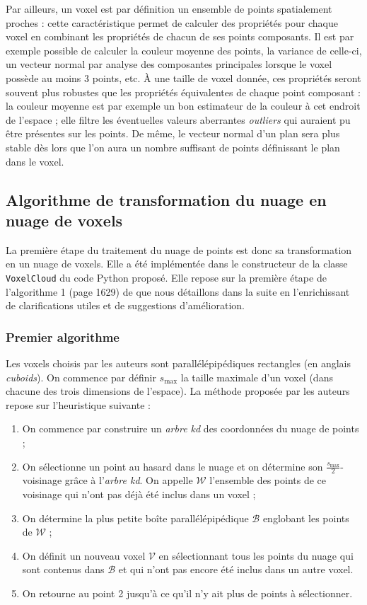 \documentclass[a4paper, onecolumn, 11pt]{article}
\newcommand{\V}{\mathcal{V}}
\begin{document}
Par ailleurs, un voxel est par définition un ensemble de points spatialement proches : cette caractéristique permet de calculer des propriétés pour chaque voxel en combinant les propriétés de chacun de ses points composants. Il est par exemple possible de calculer la couleur moyenne des points, la variance de celle-ci, un vecteur normal par analyse des composantes principales lorsque le voxel possède au moins 3 points, etc. À une taille de voxel donnée, ces propriétés seront souvent plus robustes que les propriétés équivalentes de chaque point composant : la couleur moyenne est par exemple un bon estimateur de la couleur à cet endroit de l'espace ; elle filtre les éventuelles valeurs aberrantes \emph{outliers} qui auraient pu être présentes sur les points. De même, le vecteur normal d'un plan sera plus stable dès lors que l'on aura un nombre suffisant de points définissant le plan dans le voxel.

\subsection{Algorithme de transformation du nuage en nuage de voxels}
\label{partie-algo-voxels}
La première étape du traitement du nuage de points est donc sa transformation en un nuage de voxels. Elle a été implémentée dans le constructeur de la classe \texttt{VoxelCloud} du code Python proposé. Elle repose sur la première étape de l'algorithme 1 (page 1629) de \cite{aka_article} que nous détaillons dans la suite en l'enrichissant de clarifications utiles et de suggestions d'amélioration.

\subsubsection*{Premier algorithme}
Les voxels choisis par les auteurs sont parallélépipédiques rectangles (en anglais \emph{cuboids}). On commence par définir $s_\text{max}$ la taille maximale d'un voxel (dans chacune des trois dimensions de l'espace). La méthode proposée par les auteurs repose sur l'heuristique suivante :
\begin{enumerate}
	\item On commence par construire un \emph{arbre kd} des coordonnées du nuage de points ;
	\item On sélectionne un point au hasard dans le nuage et on détermine son $\frac{s_{\text{max}}}{2}$-voisinage grâce à l'\emph{arbre kd}. On appelle $\mathcal{W}$ l'ensemble des points de ce voisinage qui n'ont pas déjà été inclus dans un voxel ;
	\item On détermine la plus petite boîte parallélépipédique $\mathcal{B}$ englobant les points de $\mathcal{W}$ ;
	\item On définit un nouveau voxel $\V$ en sélectionnant tous les points du nuage qui sont contenus dans $\mathcal{B}$ et qui n'ont pas encore été inclus dans un autre voxel.
	\item On retourne au point 2 jusqu'à ce qu'il n'y ait plus de points à sélectionner.
\end{enumerate}
\end{document}
